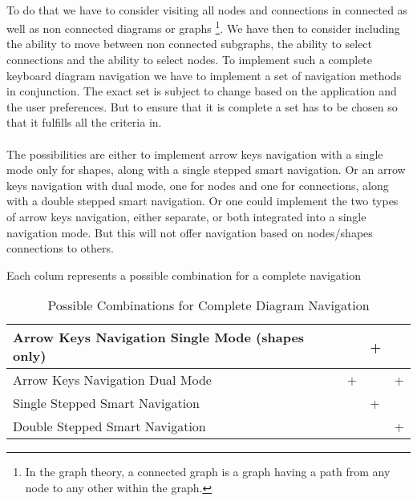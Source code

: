 \paragraph{}
To do that we have to consider visiting all nodes and connections in connected as well as non connected diagrams or graphs \footnote{In the graph theory, a connected graph is a graph having a path from any node to any other within the graph.}. We have then to consider including the ability to move between non connected subgraphs, the ability to select connections and the ability to select nodes. To implement such a complete keyboard diagram navigation we have to implement a set of navigation methods in conjunction. The exact set is subject to change based on the application and the user preferences. But to ensure that it is complete a set has to be chosen so that it fulfills all the criteria in.

\paragraph{}
The possibilities are either to implement arrow keys navigation with a single mode only for shapes, along with a single stepped smart navigation. Or an arrow keys navigation with dual mode, one for nodes and one for connections, along with a double stepped smart navigation. Or one could implement the two types of arrow keys navigation, either separate, or both integrated into a single navigation mode. But this will not offer navigation based on nodes/shapes connections to others.
\begin{table}[H]
\begin{center}
\begin{flushleft}
\footnotesize
{Each colum represents a possible combination for a complete navigation}\\
\end{flushleft}
	\begin{tabular}{| l | l | l | l |}
	\hline
	Arrow Keys Navigation Single Mode (shapes only)	&   & + &   \\ \hline
	Arrow Keys Navigation Dual Mode			& + &   & + \\ \hline
	Single Stepped Smart Navigation			&   & + &   \\ \hline
	Double Stepped Smart Navigation			&   &   & + \\ \hline
	\end{tabular}
\caption{Possible Combinations for Complete Diagram Navigation}
\end{center}
\end{table}

